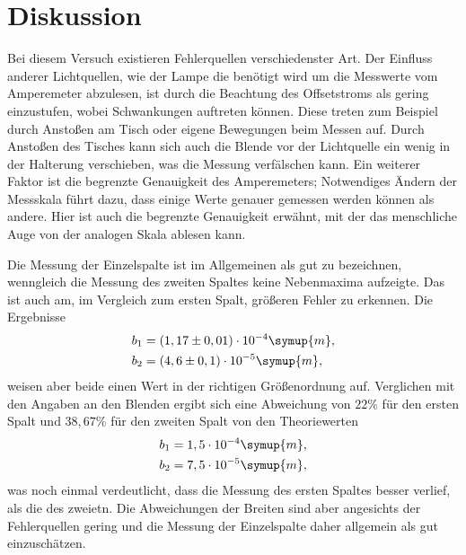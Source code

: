 \section{Diskussion}
\label{sec:Diskussion}
Bei diesem Versuch existieren Fehlerquellen verschiedenster Art. Der Einfluss anderer Lichtquellen, wie der Lampe die benötigt wird um 
die Messwerte vom Amperemeter abzulesen, ist durch die Beachtung des Offsetstroms als gering einzustufen, wobei Schwankungen auftreten können.
Diese treten zum Beispiel durch Anstoßen am Tisch oder eigene Bewegungen beim Messen auf. Durch Anstoßen des Tisches kann sich auch die Blende 
vor der Lichtquelle ein wenig in der Halterung verschieben, was die Messung verfälschen kann. Ein weiterer Faktor ist die begrenzte Genauigkeit
des Amperemeters; Notwendiges Ändern der Messskala führt dazu, dass einige Werte genauer gemessen werden können als andere. Hier ist auch die 
begrenzte Genauigkeit erwähnt, mit der das menschliche Auge von der analogen Skala ablesen kann. 

Die Messung der Einzelspalte ist im Allgemeinen als gut zu bezeichnen, wenngleich die Messung des zweiten Spaltes keine Nebenmaxima aufzeigte.
Das ist auch am, im Vergleich zum ersten Spalt, größeren Fehler zu erkennen. Die Ergebnisse
\begin{align*}
    b_1 &= (1,17 \pm 0,01) \cdot 10^{-4} \symup{m}, \\
    b_2 &= (4,6\pm 0,1) \cdot 10^{-5} \symup{m},
\end{align*}
weisen aber beide einen Wert in der richtigen Größenordnung auf. Verglichen mit den Angaben an den Blenden ergibt sich eine Abweichung von 
$22 \%$ für den ersten Spalt und $38,67 \%$ für den zweiten Spalt von den Theoriewerten
\begin{align*}
     b_1 &= 1,5 \cdot 10^{-4} \symup{m}, \\
     b_2 &= 7,5 \cdot 10^{-5} \symup{m},
\end{align*}
was noch einmal verdeutlicht, dass die Messung des ersten Spaltes besser verlief, als die des zweietn.
Die Abweichungen der Breiten sind aber angesichts der Fehlerquellen gering und die Messung der Einzelspalte daher allgemein als gut einzuschätzen.


